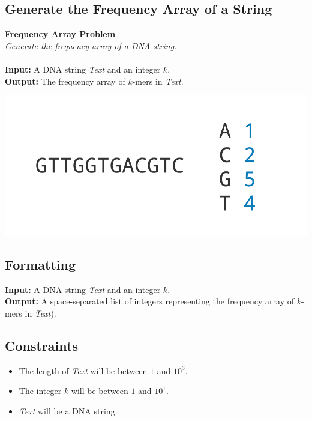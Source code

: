 \documentclass{article}
\begin{document}
\subsection{Generate the Frequency Array of a String}
\hline\vspace{5}
\noindent \textbf{Frequency Array Problem}\\
\emph{Generate the frequency array of a DNA string}.\\ \\
\textbf{Input:} A DNA string \emph{Text} and an integer $k$.\\
\textbf{Output:} The frequency array of $k$-mers in \emph{Text}.
\begin{center}
    \includegraphics[scale=0.2]{c1/logos/1K.png} 
\end{center}
\hline\vspace{5}

\subsection*{Formatting}
\textbf{Input:} A DNA string \emph{Text} and an integer $k$.\\
\noindent \textbf{Output:} A space-separated list of integers representing the frequency array of $k$-mers in \emph{Text}).

\subsection*{Constraints}
\begin{itemize}
    \item The length of \emph{Text} will be between $1$ and $10^3$.
    \item The integer $k$ will be between $1$ and $10^1$.
    \item \emph{Text} will be a DNA string.
\end{itemize}
\pagebreak
\end{document}
